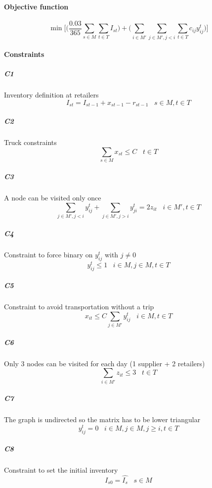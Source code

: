 \documentclass{article}
\begin{document}
\paragraph{Objective function}
\begin{equation*}
	\min{\Bigg[\Big(\frac{0.03}{365}\sum_{s\in M}\sum_{t \in T} I_{st}\Big) + \Big(\sum_{i \in M'}\sum_{j \in M', j <i}\sum_{t\in T}c_{ij}y_{ij}^t\Big)\Bigg]}
\end{equation*}

\paragraph{Constraints}
\subparagraph{C1} Inventory definition at retailers
$$I_{st} = I_{st-1} + x_{st-1}-r_{st-1} \;\;\; s \in M, t\in T $$
\subparagraph{C2} Truck constraints
$$\sum_{s \in M} x_{st} \leq C \;\;\; t\in T $$
\subparagraph{C3} A node can be visited only once
$$\sum_{j \in M', j<i} y_{ij}^t + \sum_{j \in M', j>i} y_{ji}^t = 2z_{it} \;\;\; i \in M', t \in T$$
\subparagraph{C4} Constraint to force binary on $y_{ij}^t$ with $j \neq 0$
$$y_{ij}^t \leq 1 \;\;\; i \in M, j \in M, t \in T$$
\subparagraph{C5} Constraint to avoid transportation without a trip
$$x_{it} \leq C\sum_{j \in M'}y_{ij}^t  \;\;\; i \in M, t \in T$$
\subparagraph{C6} Only 3 nodes can be visited for each day (1 supplier + 2 retailers)
$$\sum_{i \in M'}z_{it} \leq 3 \;\;\;  t \in T$$
\subparagraph{C7} The graph is undirected so the  matrix has to be lower triangular
$$y_{ij}^t = 0 \;\;\; i \in M, j \in M, j \geq i, t \in T$$
\subparagraph{C8} Constraint to set the initial inventory 
$$I_{s0} = \hat{I_s} \;\;\; s \in M$$
\end{document}
